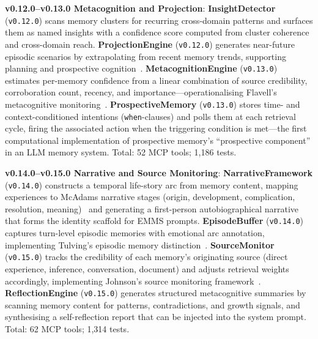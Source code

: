 \documentclass[conference]{IEEEtran}
\begin{document}
\textbf{v0.12.0--v0.13.0 Metacognition and Projection}: \textbf{InsightDetector} (\texttt{v0.12.0}) scans memory clusters for recurring cross-domain patterns and surfaces them as named insights with a confidence score computed from cluster coherence and cross-domain reach. \textbf{ProjectionEngine} (\texttt{v0.12.0}) generates near-future episodic scenarios by extrapolating from recent memory trends, supporting planning and prospective cognition~\cite{schacter2007}. \textbf{MetacognitionEngine} (\texttt{v0.13.0}) estimates per-memory confidence from a linear combination of source credibility, corroboration count, recency, and importance---operationalising Flavell's metacognitive monitoring~\cite{flavell1979}. \textbf{ProspectiveMemory} (\texttt{v0.13.0}) stores time- and context-conditioned intentions (\texttt{when}-clauses) and polls them at each retrieval cycle, firing the associated action when the triggering condition is met---the first computational implementation of prospective memory's ``prospective component'' in an LLM memory system. Total: 52 MCP tools; 1,186 tests.

\textbf{v0.14.0--v0.15.0 Narrative and Source Monitoring}: \textbf{NarrativeFramework} (\texttt{v0.14.0}) constructs a temporal life-story arc from memory content, mapping experiences to McAdams narrative stages (origin, development, complication, resolution, meaning)~\cite{mcadams1993} and generating a first-person autobiographical narrative that forms the identity scaffold for EMMS prompts. \textbf{EpisodeBuffer} (\texttt{v0.14.0}) captures turn-level episodic memories with emotional arc annotation, implementing Tulving's episodic memory distinction~\cite{tulving1983}. \textbf{SourceMonitor} (\texttt{v0.15.0}) tracks the credibility of each memory's originating source (direct experience, inference, conversation, document) and adjusts retrieval weights accordingly, implementing Johnson's source monitoring framework~\cite{johnson1993}. \textbf{ReflectionEngine} (\texttt{v0.15.0}) generates structured metacognitive summaries by scanning memory content for patterns, contradictions, and growth signals, and synthesising a self-reflection report that can be injected into the system prompt. Total: 62 MCP tools; 1,314 tests.
\end{document}
